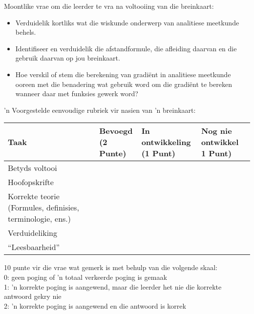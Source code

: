 Moontlike vrae om die leerder te vra na voltooiing van die breinkaart:
\begin{itemize}
\item
Verduidelik kortliks wat die wiskunde onderwerp van analitiese meetkunde behels.
\item
Identifiseer en verduidelik die afstandformule, die afleiding daarvan en die gebruik daarvan op jou breinkaart.
\item
Hoe verskil of stem die berekening van gradiënt in analitiese meetkunde ooreen met die benadering wat gebruik word om die gradiënt te bereken wanneer daar met funksies gewerk word?
\end{itemize}
'n Voorgestelde eenvoudige rubriek vir nasien van 'n breinkaart:
\begin{table}[H]
 \begin{center}
  \begin{tabular}{|p{3cm}|p{2.5cm}|p{2.5cm}|p{3cm}|} \hline
  \textbf{Taak} & \textbf{Bevoegd \newline(2 Punte)} & \textbf{In ontwikkeling \newline(1 Punt)}& \textbf{Nog nie ontwikkel \newline 1 Punt)}\\ \hline
Betyds voltooi &&&\\ \hline
Hoofopskrifte &&&\\ \hline
Korrekte teorie (Formules, definisies, terminologie, ens.) &&&\\ \hline
Verduideliking &&&\\ \hline
``Leesbaarheid''&&&\\ \hline

  \end{tabular}

 \end{center}

\end{table}

10 punte vir die vrae wat gemerk is met behulp van die volgende skaal:\\
0: geen poging of 'n totaal verkeerde poging is gemaak\\
1: 'n korrekte poging is aangewend, maar die leerder het nie die korrekte antwoord gekry nie\\
2: 'n korrekte poging is aangewend en die antwoord is korrek

